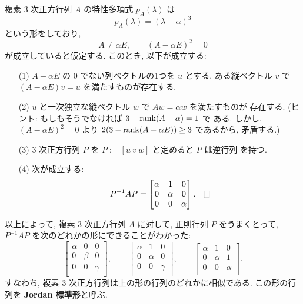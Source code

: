 \documentclass[12pt,twoside]{jarticle}
\begin{document}
\begin{question}\label{q:normal-form-3.5}
  複素 $3$ 次正方行列 $A$ の特性多項式 $p_A(\lambda)$ は
  \begin{equation*}
    p_A(\lambda) = (\lambda - \alpha)^3
  \end{equation*}
  という形をしており,
  \begin{equation*}
    A \ne \alpha E, \qquad (A - \alpha E)^2 = 0
  \end{equation*}
  が成立していると仮定する.  このとき, 以下が成立する:
  \begin{enumerate}
  \item[(1)] $A - \alpha E$ の $0$ でない列ベクトルの1つを $u$ とする.
    ある縦ベクトル $v$ で $(A - \alpha E)v = u$ を満たすものが存在する.
  \item[(2)] $u$ と一次独立な縦ベクトル $w$ で $Aw=\alpha w$ を満たすものが
    存在する.  (ヒント: もしもそうでなければ $3 - \mathop{\mathrm{rank}}\nolimits(A - \alpha) = 1$ で
    ある.  しかし, $(A - \alpha E)^2 = 0$ より %
    $2(3 - \mathop{\mathrm{rank}}\nolimits(A - \alpha E)) \ge 3$ であるから, 矛盾する.)
  \item[(3)] $3$ 次正方行列 $P$ を $P := [u\ v\ w]$ と定めると $P$ は逆行列
    を持つ. 
  \item[(4)] 次が成立する:
    \begin{equation*}
      P^{-1} A P 
      = 
      \begin{bmatrix}
        \alpha & 1 & 0 \\
        0 & \alpha & 0 \\
        0 & 0 & \alpha \\
      \end{bmatrix}.
      \qed
    \end{equation*}
  \end{enumerate}
\end{question}

以上によって, 複素 $3$ 次正方行列 $A$ に対して, 正則行列 $P$ をうまくとって,
$P^{-1}AP$ を次のどれかの形にできることがわかった:
\begin{equation*}
  \begin{bmatrix}
    \alpha & 0 & 0 \\
    0 & \beta  & 0 \\
    0 & 0 & \gamma \\
  \end{bmatrix},
  \qquad
  \begin{bmatrix}
    \alpha & 1 & 0 \\
    0 & \alpha & 0 \\
    0 & 0 & \gamma \\
  \end{bmatrix},
  \qquad
  \begin{bmatrix}
    \alpha & 1 & 0 \\
    0 & \alpha & 1 \\
    0 & 0 & \alpha \\
  \end{bmatrix}.
\end{equation*}
すなわち, 複素 $3$ 次正方行列は上の形の行列のどれかに相似である.  この形の行
列を {\bf Jordan 標準形}と呼ぶ.
\end{document}
